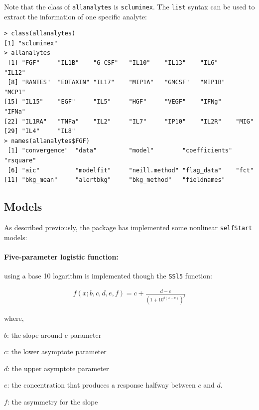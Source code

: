 \documentclass[11pt]{article}\usepackage[]{graphicx}\usepackage[]{color}
\makeatletter
\newenvironment{kframe}{%
 \def\at@end@of@kframe{}%
 \ifinner\ifhmode%
  \def\at@end@of@kframe{\end{minipage}}%
  \begin{minipage}{\columnwidth}%
 \fi\fi%
 \def\FrameCommand##1{\hskip\@totalleftmargin \hskip-\fboxsep
 \colorbox{shadecolor}{##1}\hskip-\fboxsep
     \hskip-\linewidth \hskip-\@totalleftmargin \hskip\columnwidth}%
 \MakeFramed {\advance\hsize-\width
   \@totalleftmargin\z@ \linewidth\hsize
   \@setminipage}}%
 {\par\unskip\endMakeFramed%
 \at@end@of@kframe}
\newenvironment{knitrout}{}{} %
\newenvironment{itemize*}%
    {\begin{itemize}%
        \setlength{\itemsep}{-0.35cm}%
        \setlength{\parskip}{10pt}}%
{\end{itemize}}
\makeatother
\begin{document}
\noindent Note that the class of {\tt allanalytes} is {\tt scluminex}. The 
{\tt list} syntax can be used to extract the information of one specific 
analyte:

\begin{knitrout}
\color{fgcolor}\begin{kframe}
\begin{verbatim}
> class(allanalytes)
[1] "scluminex"
> allanalytes
 [1] "FGF"     "IL1B"    "G-CSF"   "IL10"    "IL13"    "IL6"     "IL12"   
 [8] "RANTES"  "EOTAXIN" "IL17"    "MIP1A"   "GMCSF"   "MIP1B"   "MCP1"   
[15] "IL15"    "EGF"     "IL5"     "HGF"     "VEGF"    "IFNg"    "IFNa"   
[22] "IL1RA"   "TNFa"    "IL2"     "IL7"     "IP10"    "IL2R"    "MIG"    
[29] "IL4"     "IL8"    
> names(allanalytes$FGF)
 [1] "convergence"  "data"         "model"        "coefficients" "rsquare"     
 [6] "aic"          "modelfit"     "neill.method" "flag_data"    "fct"         
[11] "bkg_mean"     "alertbkg"     "bkg_method"   "fieldnames"  
\end{verbatim}
\end{kframe}
\end{knitrout}


\subsection{Models}
As described previously, the package has implemented some nonlinear 
{\tt selfStart} models:

\paragraph{Five-parameter logistic function:} using a base 10 
logarithm is implemented though the {\tt SSl5} function:

\begin{align*}
f(x; b, c, d, e, f) = c +\frac{d-c}{(1+10^{b(x-e)})^{f}}
\end{align*}

where,

\begin{itemize*}
    \item $b$: the slope around $e$ parameter
    \item $c$: the lower asymptote parameter
    \item $d$: the upper asymptote parameter
    \item $e$: the concentration that produces a response halfway between 
$c$ and $d$.
    \item $f$: the asymmetry for the slope
\end{itemize*}
\end{document}
